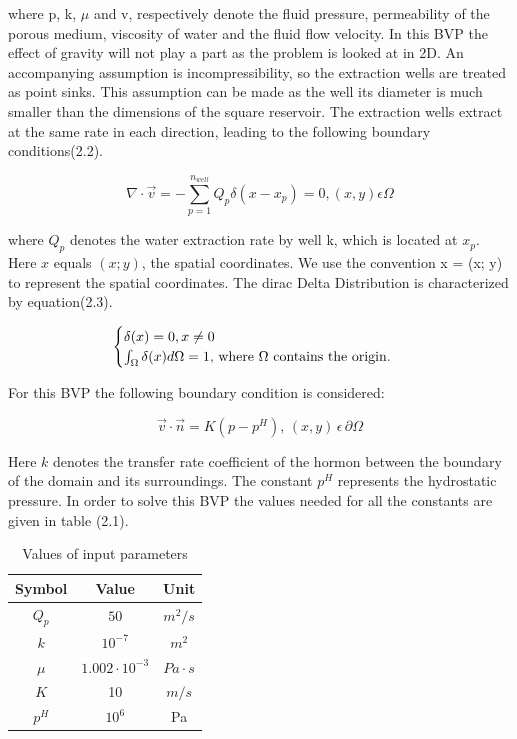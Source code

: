 \documentclass{report}
\begin{document}
where p, k, $\mu$ and v, respectively denote the 
fluid pressure, permeability of the porous medium, viscosity of water and the fluid flow velocity. In this BVP the effect of gravity will not play a part as the problem is looked at in 2D. An accompanying assumption is incompressibility, so the extraction wells are treated as point sinks. This assumption can be made as the well its diameter is much smaller than the dimensions of the square reservoir. The extraction wells extract at the same rate in each direction, leading to the following boundary conditions(2.2).


\begin{equation}
	\nabla\cdot\vec{v}=-\sum_{p=1}^{n_{well}}Q_p\delta(x-x_p)=0,(x,y) \epsilon\Omega 
\end{equation}

where $Q_p$ denotes the water extraction rate by well k, which is located at $x_p$. Here $x$ equals $(x;y)$, the spatial coordinates.  We use the convention x = (x; y) to represent the spatial coordinates. The dirac Delta Distribution is characterized by equation(2.3).

\begin{equation}
	\begin{cases} 
		\delta(x) = 0,x \neq 0 \\ \int_{\Omega}\delta(x)d\Omega = 1,$  where $\Omega $  contains the origin.$
	\end{cases} 
\end{equation}

\medskip

For this BVP the following boundary condition is considered: 

\begin{equation}
	\vec{v}\cdot\vec{n}=K(p-p^H), \, (x,y)\, \epsilon\,  \partial\Omega
\end{equation}
\bigskip

Here $k$ denotes the transfer rate coefficient of the hormon between the boundary of the domain and its surroundings. The constant $p^H$ represents the hydrostatic pressure. In order to solve this BVP the values needed for all the constants are given in table (2.1).


\begin{table}[ht]
	\caption{Values of input parameters} %
	\centering %
	\begin{tabular}{c c c} %
		\hline\hline %
		Symbol & Value & Unit\\ [0.5ex] %
		\hline %
		$Q_p$ & $50$ & $m^2/s$ \\ %
		$k$ & $10^{-7}$ & $m^2$ \\
		$\mu$ & $1.002\cdot 10^{-3}$ & $Pa\cdot s$ \\
		$K$ & 10 & $m/s$ \\
		$p^H$ & $10^6$ & Pa \\ [1ex] %
		\hline %
	\end{tabular}
	\label{table:nonlin} %
\end{table}
\bigskip
\end{document}
